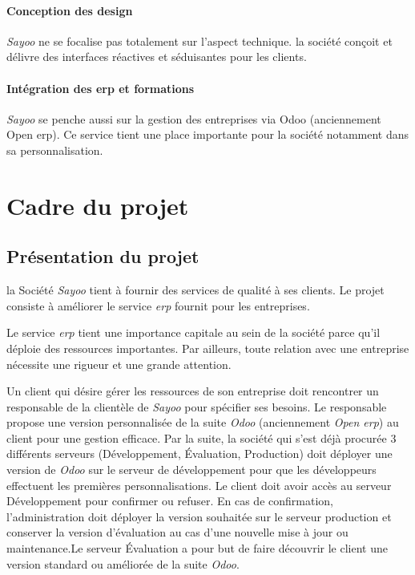 \begin{onehalfspace}
\paragraph*{Conception des design}
\emph{Sayoo} ne se focalise pas totalement sur l'aspect technique. la société conçoit et délivre des interfaces réactives et séduisantes pour les clients.


\paragraph*{Intégration des \acrshort{erp} et formations}
\emph{Sayoo} se penche aussi sur la gestion des entreprises via Odoo (anciennement Open \acrshort{erp}). Ce service tient une place importante pour la société notamment dans sa personnalisation.

\section{Cadre du projet}


\subsection{Présentation du projet}
 
la Société \emph{Sayoo} tient à fournir des services de qualité à ses clients. Le projet consiste à améliorer le service \emph{\acrshort{erp}} fournit pour les entreprises.

Le service \emph{\acrshort{erp}} tient une importance capitale au sein de la société parce qu'il déploie des ressources importantes. Par ailleurs, toute relation avec une entreprise nécessite une rigueur et une grande attention.

Un client qui désire gérer les ressources de son entreprise  doit rencontrer un responsable de la clientèle de \emph{Sayoo} pour spécifier ses besoins. Le responsable propose une version personnalisée de la suite \emph{Odoo} (anciennement \emph{Open \acrshort{erp}}) au client pour une gestion efficace. Par la suite, la société qui s'est déjà procurée  3 différents serveurs (Développement, Évaluation, Production) doit déployer une version de \emph{Odoo} sur le serveur de développement pour que les développeurs effectuent les premières personnalisations. Le client doit avoir accès au serveur Développement pour confirmer ou refuser. En cas de confirmation, l'administration doit déployer la version souhaitée sur le serveur production et conserver la version d'évaluation au cas d'une nouvelle mise à jour ou maintenance.Le serveur Évaluation a pour but de faire découvrir le client une version standard ou améliorée de la suite \emph{Odoo}.  


\end{onehalfspace}
